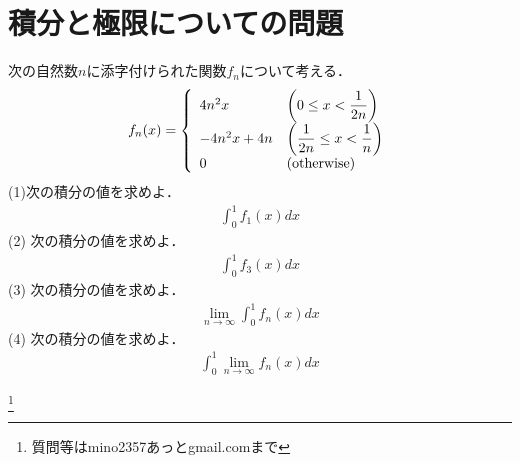\documentclass[12pt]{jarticle}
\date{}
\begin{document}

\section*{積分と極限についての問題}

次の自然数$n$に添字付けられた関数$f_n$について考える．
\begin{align*}
  f_{n}(x) =
\left\{ \begin{array}{ll}
4n^{2}x & \left(0 \le x < \dfrac{1}{2n}\right) \\
-4n^{2}x + 4n & \left(\dfrac{1}{2n} \le x < \dfrac{1}{n}\right) \\
0 & \left(\rm{otherwise}\right) \\
\end{array} \right.
\end{align*}
(1)次の積分の値を求めよ．
\begin{align*}
\int_{0}^{1} f_{1}(x) dx
\end{align*}
(2) 次の積分の値を求めよ．
\begin{align*}
\int_{0}^{1} f_{3}(x) dx
\end{align*}
(3) 次の積分の値を求めよ．
\begin{align*}
\lim_{n \to \infty} \int_{0}^{1} f_{n}(x) dx
\end{align*}
(4) 次の積分の値を求めよ．
\begin{align*}
\int_{0}^{1} \lim_{n \to \infty} f_{n}(x) dx
\end{align*}

\footnote[0]{
質問等はmino2357あっとgmail.comまで
}

\thispagestyle{empty}
\end{document}
